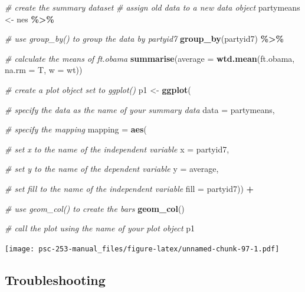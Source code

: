 \documentclass[
]{book}
\newenvironment{Shaded}{\begin{snugshade}}{\end{snugshade}}
\newcommand{\AttributeTok}[1]{\textcolor[rgb]{0.13,0.29,0.53}{#1}}
\newcommand{\CommentTok}[1]{\textcolor[rgb]{0.56,0.35,0.01}{\textit{#1}}}
\newcommand{\FunctionTok}[1]{\textcolor[rgb]{0.13,0.29,0.53}{\textbf{#1}}}
\newcommand{\NormalTok}[1]{#1}
\newcommand{\OtherTok}[1]{\textcolor[rgb]{0.56,0.35,0.01}{#1}}
\newcommand{\SpecialCharTok}[1]{\textcolor[rgb]{0.81,0.36,0.00}{\textbf{#1}}}
\begin{document}
\begin{Shaded}
\begin{Highlighting}[]
\CommentTok{\# create the summary dataset}
\CommentTok{\# assign old data to a new data object}
\NormalTok{partymeans }\OtherTok{\textless{}{-}}\NormalTok{ nes }\SpecialCharTok{\%\textgreater{}\%}
  
  \CommentTok{\# use group\_by() to group the data by partyid7}
  \FunctionTok{group\_by}\NormalTok{(partyid7) }\SpecialCharTok{\%\textgreater{}\%}
  
  \CommentTok{\# calculate the means of ft.obama}
  \FunctionTok{summarise}\NormalTok{(}\AttributeTok{average =} \FunctionTok{wtd.mean}\NormalTok{(ft.obama, }\AttributeTok{na.rm =}\NormalTok{ T,}
                               \AttributeTok{w =}\NormalTok{ wt))}

\CommentTok{\# create a plot object set to \textasciigrave{}ggplot()\textasciigrave{}}
\NormalTok{p1 }\OtherTok{\textless{}{-}} \FunctionTok{ggplot}\NormalTok{(}
  
  \CommentTok{\# specify the data as the name of your summary data}
  \AttributeTok{data =}\NormalTok{ partymeans,}
  
  \CommentTok{\# specify the mapping}
  \AttributeTok{mapping =} \FunctionTok{aes}\NormalTok{(}
    
    \CommentTok{\# set x to the name of the independent variable}
    \AttributeTok{x =}\NormalTok{ partyid7,}
    
    \CommentTok{\# set y to the name of the dependent variable}
    \AttributeTok{y =}\NormalTok{ average,}
    
    \CommentTok{\# set \textasciigrave{}fill\textasciigrave{} to the name of the independent variable}
    \AttributeTok{fill =}\NormalTok{ partyid7)) }\SpecialCharTok{+}
  
  \CommentTok{\# use \textasciigrave{}geom\_col() to create the bars}
  \FunctionTok{geom\_col}\NormalTok{()}

\CommentTok{\# call the plot using the name of your plot object}
\NormalTok{p1}
\end{Highlighting}
\end{Shaded}

\texttt{[image: psc-253-manual\_files/figure-latex/unnamed-chunk-97-1.pdf]}

\hypertarget{troubleshooting-38}{%
\subsection{Troubleshooting}\label{troubleshooting-38}}
\end{document}
